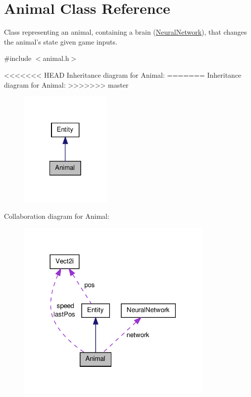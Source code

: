 \hypertarget{class_animal}{\section{Animal Class Reference}
\label{class_animal}
}


Class representing an animal, containing a brain (\hyperlink{class_neural_network}{Neural\-Network}), that changes the animal's state given game inputs.  




{\ttfamily \#include $<$animal.\-h$>$}



<<<<<<< HEAD
Inheritance diagram for Animal\-:
\nopagebreak
=======
Inheritance diagram for Animal\-:\nopagebreak
>>>>>>> master
\begin{figure}[H]
\begin{center}
\leavevmode
\includegraphics[width=126pt]{class_animal__inherit__graph}
\end{center}
\end{figure}


Collaboration diagram for Animal\-:
\nopagebreak
\begin{figure}[H]
\begin{center}
\leavevmode
\includegraphics[width=270pt]{class_animal__coll__graph}
\end{center}
\end{figure}
